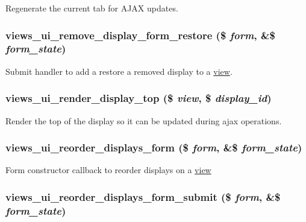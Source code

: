 \label{admin_8inc_a0c7f4e9787916976d7dab26c969f2cea}
Regenerate the current tab for AJAX updates. \hypertarget{admin_8inc_a85640b9f63281c89ed546c623c22c776}{
\subsubsection[{views\_\-ui\_\-remove\_\-display\_\-form\_\-restore}]{\setlength{\rightskip}{0pt plus 5cm}views\_\-ui\_\-remove\_\-display\_\-form\_\-restore (\$ {\em form}, \/  \&\$ {\em form\_\-state})}}
\label{admin_8inc_a85640b9f63281c89ed546c623c22c776}
Submit handler to add a restore a removed display to a \hyperlink{classview}{view}. \hypertarget{admin_8inc_a54f35232b2bafdf4b16ef6e1a9547d22}{
\subsubsection[{views\_\-ui\_\-render\_\-display\_\-top}]{\setlength{\rightskip}{0pt plus 5cm}views\_\-ui\_\-render\_\-display\_\-top (\$ {\em view}, \/  \$ {\em display\_\-id})}}
\label{admin_8inc_a54f35232b2bafdf4b16ef6e1a9547d22}
Render the top of the display so it can be updated during ajax operations. \hypertarget{admin_8inc_a57e9957bb8e9d4c1b1cbce89e6150d47}{
\subsubsection[{views\_\-ui\_\-reorder\_\-displays\_\-form}]{\setlength{\rightskip}{0pt plus 5cm}views\_\-ui\_\-reorder\_\-displays\_\-form (\$ {\em form}, \/  \&\$ {\em form\_\-state})}}
\label{admin_8inc_a57e9957bb8e9d4c1b1cbce89e6150d47}
Form constructor callback to reorder displays on a \hyperlink{classview}{view} \hypertarget{admin_8inc_aae24eefaa1669ab2602066dbb0dc088f}{
\subsubsection[{views\_\-ui\_\-reorder\_\-displays\_\-form\_\-submit}]{\setlength{\rightskip}{0pt plus 5cm}views\_\-ui\_\-reorder\_\-displays\_\-form\_\-submit (\$ {\em form}, \/  \&\$ {\em form\_\-state})}}
